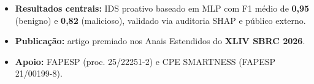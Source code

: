 \documentclass[a1paper,english,brazilian]{article}
\begin{document}
\begin{tcbposter}[
  poster = {
    rows = 6,
    columns = 12,
    colspacing = 0.85cm,
    rowspacing = 0.55cm,
  },
]
{    \begin{itemize}\setlength{\itemsep}{5pt}
      \item \textbf{Resultados centrais:} IDS proativo baseado em MLP com F1 médio de \textbf{0,95} (benigno) e \textbf{0,82} (malicioso), validado via auditoria SHAP e público externo.
      \item \textbf{Publicação:} artigo premiado nos Anais Estendidos do \textbf{XLIV SBRC 2026}.
      \item \textbf{Apoio:} FAPESP (proc. 25/22251-2) e CPE SMARTNESS (FAPESP 21/00199-8).
    \end{itemize}
}

\end{tcbposter}
\end{document}
